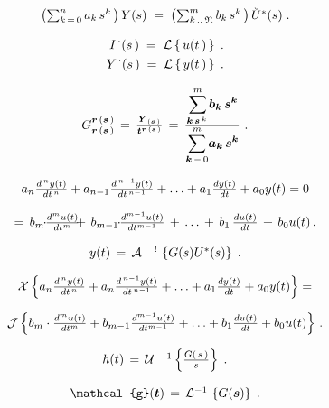 \documentclass{article}
\begin{document}
\[
$$
\left( \sum_{k \,=\, 0}^{n} a_{k} \, s^{k} \, \right) Y ( s ) \;=\; \left( \sum_{k \,.. \, \mathfrak{N}}^{m} b_{k} \, s^{k} \, \right) \breve{U}^{*} ( s ) \;.
$$
\]

\[
$$
\begin{aligned} {I^{\, \cdot} ( s \, ) \;=\; \mathcal{L} \left\{\, u ( t \, ) \, \right\} \;.} \\ {Y^{\, \cdot} ( s \, ) \;=\; \mathcal{L} \left\{\, y ( t \, ) \, \right\} \;.} \\ \end{aligned}
$$
\]

\[
$$
G_{\boldsymbol{r} \, ( \boldsymbol{s} \, )}^{\boldsymbol{r} \, ( \boldsymbol{s} \, )} \,=\, \frac{\boldsymbol{Y}_{( \boldsymbol{s} \, )}} {\boldsymbol{t}^{\boldsymbol{r} \, ( \boldsymbol{s} \, )}} \,=\, \frac{\displaystyle{\sum_{\boldsymbol{k} \, \boldsymbol{s} \,^{k} \,}^{m}} \boldsymbol{b}_{\boldsymbol{k}} \, \boldsymbol{s}^{\boldsymbol{k}}} {\displaystyle{\sum_{\boldsymbol{k} \,-\, 0}^{m}} \boldsymbol{a}_{\boldsymbol{k}} \, \boldsymbol{s}^{\boldsymbol{k}}} \ .
$$
\]

\[
$$
a_{n} {\frac{d^{\, n} y ( t )} {d t^{\, n}}}+a_{n-1} {\frac{d^{\, n-1} y ( t )} {d t^{\, n-1}}}+\ldots+a_{1} {\frac{d y ( t )} {d t}}+a_{0} y ( t )=0
$$
\]

\[
$$
= \, b_{m} \! \! \cdot\! \! \frac{d^{m} u ( t )} {d t^{m}} \! \! \!+\, b_{m-1} \! \! \cdot\! \! \frac{d^{m-1} u ( t )} {d t^{m-1}} \,+\, \ldots\,+\, b_{1} \, \frac{d u ( t )} {d t} \,+\, b_{0} u ( t ) \,.
$$
\]

\[
$$
y ( t ) \,=\, \mathcal{A} \quad^{!} \, \left\{G ( s ) U^{*} ( s ) \right\} \;.
$$
\]

\[
$$
\mathcal{X} \left\{a_{n} \frac{d^{\, n} y ( t )} {d t^{\, n}}+a_{n} \frac{d^{\, n-1} y ( t )} {d t^{\, n-1}}+\ldots+a_{1} \frac{d y ( t )} {d t}+a_{0} y ( t ) \right\}=
$$
\]

\[
$$
\mathcal{J} \left\{b_{m} \cdot\frac{d^{m} u ( t )} {d t^{m}}+b_{m-1} \frac{d^{m-1} u ( t )} {d t^{m-1}}+\ldots+b_{1} \frac{d u ( t )} {d t}+b_{0} u ( t ) \right\} \,.
$$
\]

\[
$$
h ( t ) \,=\, \mathcal{U} \quad^{1} \left\{\frac{G ( \, s \, )} {s} \right\} \;.
$$
\]

\[
$$
\mathcal{g} ( \boldsymbol{t} ) \,=\, \mathcal{L}^{-1} \, \left\{G ( \boldsymbol{s} ) \right\} \;.
$$
\]
\end{document}
